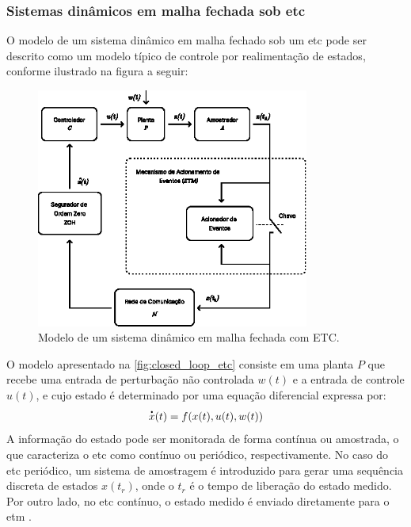 \subsubsection{Sistemas dinâmicos em malha fechada sob \acrshort{etc}}
O modelo de um sistema dinâmico em malha fechado sob um \acrshort{etc} pode ser descrito como um modelo típico de controle por realimentação de estados, conforme ilustrado na figura a seguir:

\begin{figure}[H]
  \centering
  \includegraphics[width=0.8\textwidth]{figuras/etc-model.eps}
  \caption{Modelo de um sistema dinâmico em malha fechada com ETC.}
  \label{fig:closed_loop_etc}
\end{figure}

O modelo apresentado na \autoref{fig:closed_loop_etc} consiste em uma planta $P$ que recebe uma entrada de perturbação não controlada $w(t)$ e a entrada de controle $u(t)$, e cujo estado é determinado por uma equação diferencial expressa por: \begin{equation}\dt{x}(t) = f(x(t), u(t), w(t))\end{equation} A informação do estado pode ser monitorada de forma contínua ou amostrada, o que caracteriza o \acrshort{etc} como contínuo ou periódico, respectivamente. No caso do \acrshort{etc} periódico, um sistema de amostragem é introduzido para gerar uma sequência discreta de estados $x(t_r)$, onde o $t_r$ é o tempo de liberação do estado medido. Por outro lado, no \acrshort{etc} contínuo, o estado medido é enviado diretamente para o \acrshort{etm} \citep{peng2018,coutinho2021,Lemmon2010}.

